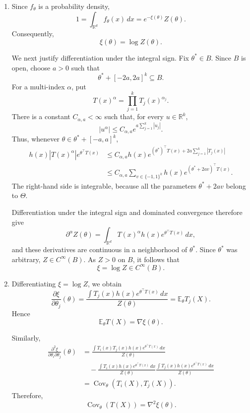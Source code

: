 \documentclass[lang=en,11pt,a4paper,citestyle=authoryear]{elegantpaper}
\newcommand{\R}{\mathbb{R}}
\newcommand{\E}{\mathbb{E}}
\begin{document}
\begin{enumerate}[label=(\arabic*),leftmargin=*]
\item Since $f_\theta$ is a probability density,
\[
1
=
\int_{\R^d}f_\theta(x)\,dx
=
e^{-\xi(\theta)}Z(\theta).
\]
Consequently,
\[
\xi(\theta)=\log Z(\theta).
\]

We next justify differentiation under the integral sign.
Fix $\theta^\ast\in B$. Since $B$ is open, choose $a>0$ such that
\[
\theta^\ast+[-2a,2a]^k\subseteq B.
\]
For a multi-index $\alpha$, put
\[
T(x)^\alpha=\prod_{j=1}^k T_j(x)^{\alpha_j}.
\]
There is a constant $C_{\alpha,a}<\infty$ such that, for every
$u\in\R^k$,
\[
|u^\alpha|
\leq C_{\alpha,a}e^{a\sum_{j=1}^k|u_j|}.
\]
Thus, whenever $\theta\in\theta^\ast+[-a,a]^k$,
\[
\begin{aligned}
h(x)|T(x)^\alpha|e^{\theta^\top T(x)}
&\leq
C_{\alpha,a}h(x)
e^{(\theta^\ast)^\top T(x)+2a\sum_{j=1}^k|T_j(x)|}\\
&\leq
C_{\alpha,a}
\sum_{v\in\{-1,1\}^k}
h(x)e^{(\theta^\ast+2av)^\top T(x)}.
\end{aligned}
\]
The right-hand side is integrable, because all the parameters
$\theta^\ast+2av$ belong to $\Theta$.

Differentiation under the integral sign and dominated convergence
therefore give
\[
\partial^\alpha Z(\theta)
=
\int_{\R^d}
T(x)^\alpha h(x)e^{\theta^\top T(x)}\,dx,
\]
and these derivatives are continuous in a neighborhood of
$\theta^\ast$. Since $\theta^\ast$ was arbitrary,
$Z\in C^\infty(B)$. As $Z>0$ on $B$, it follows that
\[
{\xi=\log Z\in C^\infty(B)}.
\]

\item Differentiating $\xi=\log Z$, we obtain
\[
\frac{\partial\xi}{\partial\theta_j}(\theta)
=
\frac{
\int T_j(x)h(x)e^{\theta^\top T(x)}\,dx
}{
Z(\theta)
}
=
\E_\theta T_j(X).
\]
Hence
\[
{\E_\theta T(X)=\nabla\xi(\theta)}.
\]

Similarly,
\[
\begin{aligned}
\frac{\partial^2\xi}
{\partial\theta_i\partial\theta_j}(\theta)
&=
\frac{
\int T_i(x)T_j(x)h(x)e^{\theta^\top T(x)}\,dx
}{
Z(\theta)
}\\
&\quad-
\frac{
\int T_i(x)h(x)e^{\theta^\top T(x)}\,dx
}{
Z(\theta)
}
\frac{
\int T_j(x)h(x)e^{\theta^\top T(x)}\,dx
}{
Z(\theta)
}\\
&=
\operatorname{Cov}_\theta(T_i(X),T_j(X)).
\end{aligned}
\]
Therefore,
\[
{
\operatorname{Cov}_\theta(T(X))
=
\nabla^2\xi(\theta)
}.
\]


\end{enumerate}
\end{document}
